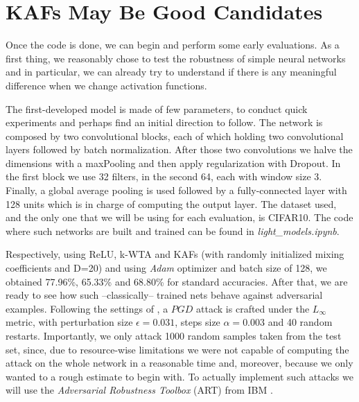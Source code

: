\documentclass[LaM,binding=0.6cm]{./packages/sapthesis/sapthesis}
\begin{document}
    \section{KAFs May Be Good Candidates}

        Once the code is done, we can begin and perform some early evaluations. As a first thing, we reasonably chose to test the robustness of simple neural 
        networks and in particular, we can already try to understand if there is any meaningful difference when we change activation functions.

        The first-developed model is made of few parameters, to conduct quick experiments and perhaps find an initial direction to follow. The network 
        is composed by two convolutional blocks, each of which holding two convolutional layers followed by batch normalization. After those two convolutions we 
        halve the dimensions with a maxPooling and then apply regularization with Dropout. In the first block we use 32 filters, in the second 64, each with window 
        size 3. Finally, a global average pooling is used followed by a fully-connected layer with 128 units which is in charge of computing the output layer.
        The dataset used, and the only one that we will be using for each evaluation, is CIFAR10. The code where such networks are built and trained can be found in 
        \textit{light\_models.ipynb}.

        Respectively, using ReLU, k-WTA and KAFs (with randomly initialized mixing coefficients and D=20) and using \textit{Adam} optimizer and batch size of 128, we obtained 77.96\%, 65.33\%
        and 68.80\% for standard accuracies. After that, we are ready to see how such --classically-- trained nets behave against adversarial examples. Following the settings of 
        \cite{kwta}, a $PGD$ attack is crafted under the $L_{\infty}$ metric, with perturbation size $\epsilon = 0.031$, steps size $\alpha = 0.003$ and 40 random 
        restarts. Importantly, we only attack 1000 random samples taken from the test set, since, due to resource-wise limitations we were not capable of computing 
        the attack on the whole network in a reasonable time and, moreover, because we only wanted to a rough estimate to begin with. To actually implement such attacks we 
        will use the \textit{Adversarial Robustness Toolbox} (ART) from IBM \cite{art}.
\end{document}
